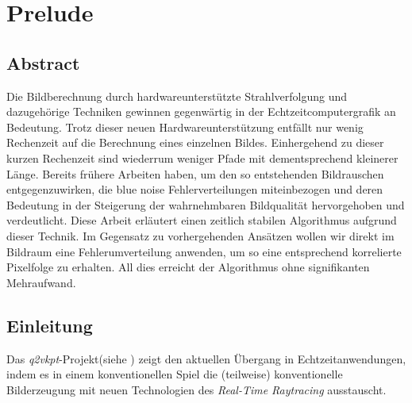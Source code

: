 

\chapter{Prelude}
\label{ch:Introduction}

\section{Abstract}

\vspace*{\fill}

Die Bildberechnung durch hardwareunterstützte Strahlverfolgung und dazugehörige Techniken gewinnen gegenwärtig in der Echtzeitcomputergrafik an Bedeutung. 
Trotz dieser neuen Hardwareunterstützung entfällt nur wenig Rechenzeit auf die Berechnung eines
einzelnen Bildes. Einhergehend zu dieser kurzen Rechenzeit sind wiederrum weniger Pfade mit dementsprechend kleinerer
Länge. Bereits frühere Arbeiten haben, um den so entstehenden Bildrauschen entgegenzuwirken,
die blue noise Fehlerverteilungen miteinbezogen und deren Bedeutung in der Steigerung der wahrnehmbaren Bildqualität hervorgehoben und verdeutlicht.
Diese Arbeit erläutert einen zeitlich stabilen Algorithmus aufgrund dieser Technik. Im Gegensatz zu vorhergehenden Ansätzen wollen wir direkt im Bildraum eine Fehlerumverteilung anwenden, um so eine entsprechend 
korrelierte Pixelfolge zu erhalten. All dies erreicht der Algorithmus ohne signifikanten Mehraufwand.
\vfill

\newpage

\section{Einleitung}
\vspace*{\fill}

Das \textit{q2vkpt}-Projekt(siehe \cite{Sch19}) zeigt den aktuellen Übergang in Echtzeitanwendungen, indem es in einem konventionellen Spiel die (teilweise) konventionelle Bilderzeugung 
mit neuen Technologien  des \textit{Real-Time Raytracing} ausstauscht.

